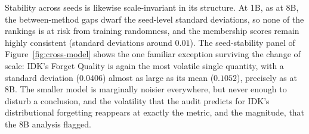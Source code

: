 \documentclass[a4paper,12pt]{report}
\begin{document}
Stability across seeds is likewise scale-invariant in its structure. At 1B, as at 8B, the between-method gaps dwarf the seed-level standard deviations, so none of the rankings is at risk from training randomness, and the membership scores remain highly consistent (standard deviations around $0.01$). The seed-stability panel of Figure~\ref{fig:cross-model} shows the one familiar exception surviving the change of scale: IDK's Forget Quality is again the most volatile single quantity, with a standard deviation ($0.0406$) almost as large as its mean ($0.1052$), precisely as at 8B. The smaller model is marginally noisier everywhere, but never enough to disturb a conclusion, and the volatility that the audit predicts for IDK's distributional forgetting reappears at exactly the metric, and the magnitude, that the 8B analysis flagged.
\end{document}
